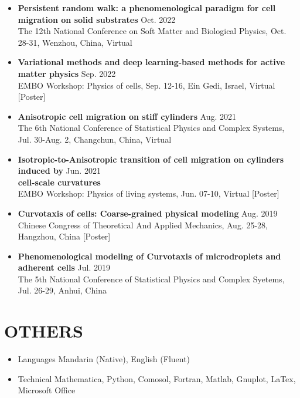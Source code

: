 \documentclass[a4paper,10pt]{extarticle}
\begin{document}
\begin{itemize}[leftmargin=*]
\item 
\textbf{Persistent random walk: a phenomenological paradigm for cell migration on solid substrates} \hfill Oct. 2022 \\
The 12th National Conference on Soft Matter and Biological Physics, Oct. 28-31, Wenzhou, China, Virtual \\

\item 
\textbf{Variational methods and deep learning-based methods for active matter physics }  \hfill Sep. 2022 \\
EMBO Workshop: Physics of cells, Sep. 12-16, Ein Gedi, Israel, Virtual \hfill[Poster]\\

\item 
\textbf{Anisotropic cell migration on stiff cylinders}  \hfill Aug. 2021 \\
The 6th National Conference of Statistical Physics and Complex Systems, Jul. 30-Aug. 2, Changchun, China, Virtual \\

\item 
\textbf{Isotropic-to-Anisotropic transition of cell migration on cylinders induced by} \hfill Jun. 2021\\\textbf{cell-scale curvatures }   \\
EMBO Workshop: Physics of living systems, Jun. 07-10, Virtual \hfill[Poster]\\

\item 
\textbf{Curvotaxis of cells: Coarse-grained physical modeling }  \hfill Aug. 2019 \\
Chinese Congress of Theoretical And Applied Mechanics, Aug. 25-28, Hangzhou, China \hfill[Poster]\\

\item 
\textbf{Phenomenological modeling of Curvotaxis of microdroplets and adherent cells}  \hfill Jul. 2019 \\
The 5th National Conference of Statistical Physics and Complex Syetems, Jul. 26-29, Anhui, China \\
\end{itemize}

\vspace{-2em}

\section*{OTHERS}
\begin{itemize}[leftmargin=*]
 \item Languages \hfill Mandarin (Native), English (Fluent)
 \item Technical \hfill Mathematica, Python, Comosol, Fortran, Matlab, Gnuplot, LaTex, Microsoft Office
 \end{itemize}
\noindent
\vspace{-2em}
\end{document}
